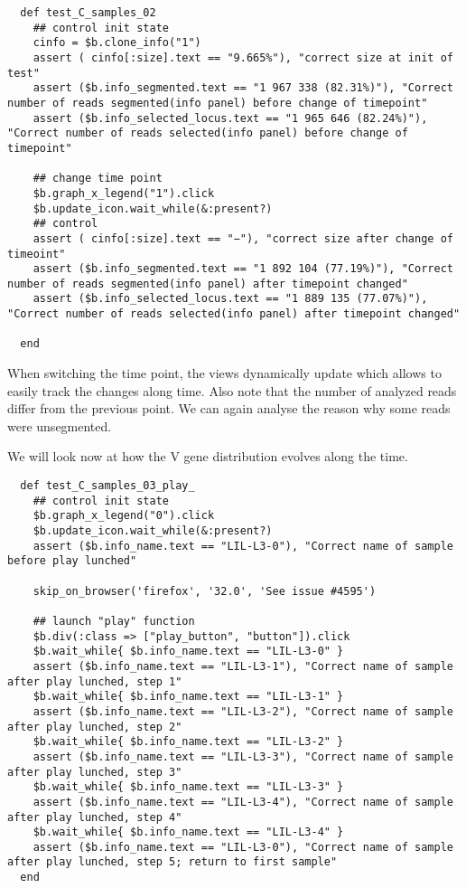 \begin{verbatim}
  def test_C_samples_02
    ## control init state
    cinfo = $b.clone_info("1")
    assert ( cinfo[:size].text == "9.665%"), "correct size at init of test"
    assert ($b.info_segmented.text == "1 967 338 (82.31%)"), "Correct number of reads segmented(info panel) before change of timepoint"
    assert ($b.info_selected_locus.text == "1 965 646 (82.24%)"), "Correct number of reads selected(info panel) before change of timepoint"

    ## change time point
    $b.graph_x_legend("1").click
    $b.update_icon.wait_while(&:present?)
    ## control
    assert ( cinfo[:size].text == "−"), "correct size after change of timeoint"
    assert ($b.info_segmented.text == "1 892 104 (77.19%)"), "Correct number of reads segmented(info panel) after timepoint changed"
    assert ($b.info_selected_locus.text == "1 889 135 (77.07%)"), "Correct number of reads selected(info panel) after timepoint changed"

  end
\end{verbatim}

When switching the time point, the views dynamically update which allows to
easily track the changes along time. Also note that the number of analyzed
reads differ from the previous point. We can again analyse the reason why some
reads were unsegmented.

\bigskip

We will look now at how the V gene distribution evolves along the time.
\begin{verbatim}
  def test_C_samples_03_play_
    ## control init state
    $b.graph_x_legend("0").click
    $b.update_icon.wait_while(&:present?)
    assert ($b.info_name.text == "LIL-L3-0"), "Correct name of sample before play lunched"

    skip_on_browser('firefox', '32.0', 'See issue #4595')

    ## launch "play" function
    $b.div(:class => ["play_button", "button"]).click
    $b.wait_while{ $b.info_name.text == "LIL-L3-0" }
    assert ($b.info_name.text == "LIL-L3-1"), "Correct name of sample after play lunched, step 1"
    $b.wait_while{ $b.info_name.text == "LIL-L3-1" }
    assert ($b.info_name.text == "LIL-L3-2"), "Correct name of sample after play lunched, step 2" 
    $b.wait_while{ $b.info_name.text == "LIL-L3-2" }
    assert ($b.info_name.text == "LIL-L3-3"), "Correct name of sample after play lunched, step 3"
    $b.wait_while{ $b.info_name.text == "LIL-L3-3" }
    assert ($b.info_name.text == "LIL-L3-4"), "Correct name of sample after play lunched, step 4"
    $b.wait_while{ $b.info_name.text == "LIL-L3-4" }
    assert ($b.info_name.text == "LIL-L3-0"), "Correct name of sample after play lunched, step 5; return to first sample"
  end
\end{verbatim}

